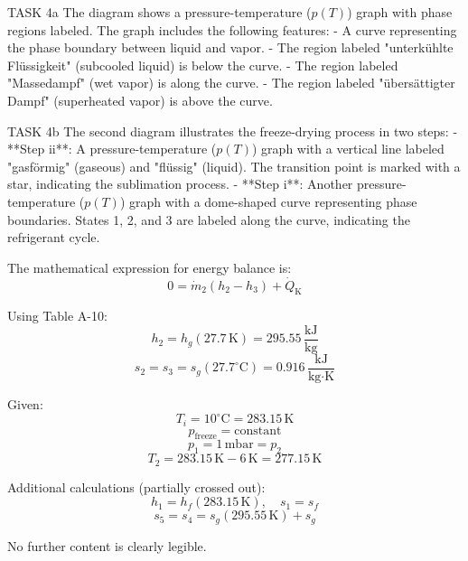 TASK 4a  
The diagram shows a pressure-temperature (\( p(T) \)) graph with phase regions labeled. The graph includes the following features:  
- A curve representing the phase boundary between liquid and vapor.  
- The region labeled "unterkühlte Flüssigkeit" (subcooled liquid) is below the curve.  
- The region labeled "Massedampf" (wet vapor) is along the curve.  
- The region labeled "übersättigter Dampf" (superheated vapor) is above the curve.  

TASK 4b  
The second diagram illustrates the freeze-drying process in two steps:  
- **Step ii**: A pressure-temperature (\( p(T) \)) graph with a vertical line labeled "gasförmig" (gaseous) and "flüssig" (liquid). The transition point is marked with a star, indicating the sublimation process.  
- **Step i**: Another pressure-temperature (\( p(T) \)) graph with a dome-shaped curve representing phase boundaries. States 1, 2, and 3 are labeled along the curve, indicating the refrigerant cycle.  

The mathematical expression for energy balance is:  
\[
0 = \dot{m}_2 (h_2 - h_3) + \dot{Q}_{\text{K}}
\]  

Using Table A-10:  
\[
h_2 = h_g(27.7 \, \text{K}) = 295.55 \, \frac{\text{kJ}}{\text{kg}}
\]  
\[
s_2 = s_3 = s_g(27.7^\circ\text{C}) = 0.916 \, \frac{\text{kJ}}{\text{kg·K}}
\]  

Given:  
\[
T_i = 10^\circ\text{C} = 283.15 \, \text{K}
\]  
\[
p_{\text{freeze}} = \text{constant}
\]  
\[
p_1 = 1 \, \text{mbar} = p_2
\]  
\[
T_2 = 283.15 \, \text{K} - 6 \, \text{K} = 277.15 \, \text{K}
\]  

Additional calculations (partially crossed out):  
\[
h_1 = h_f(283.15 \, \text{K}), \quad s_1 = s_f
\]  
\[
s_5 = s_4 = s_g(295.55 \, \text{K}) + s_g
\]  

No further content is clearly legible.